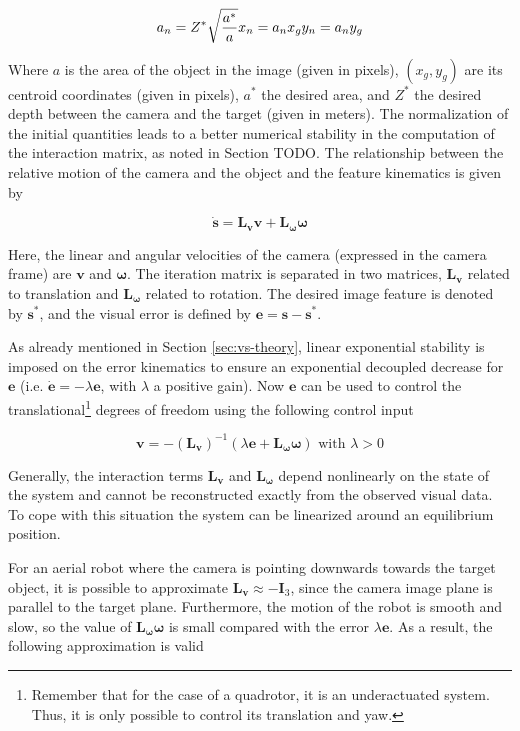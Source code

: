 \begin{equation*}
a_n = Z^\ast \sqrt{\frac{a^\ast}{a}} \\
x_n = a_n x_g \\
 y_n = a_n y_g 
\end{equation*}

Where $a$ is the area of the object in the image (given in pixels), $\left( x_g , y_g \right) $ are its centroid coordinates (given in pixels), $a^\ast$ the desired area, and $Z^\ast$ the desired depth between the camera and the target (given in meters). The normalization of the initial quantities leads to a better numerical stability in the computation of the interaction matrix, as noted in Section TODO. The relationship between the relative motion of the camera and the object and the feature kinematics is given by

\begin{equation}
\dot{\bm{s}} = \bm{L_v} \bm{v} + \bm{L_\omega} \bm{\omega}
\end{equation}

Here, the linear and angular velocities of the camera (expressed in the camera frame) are $\bm{v}$ and $\bm{\omega}$. The iteration matrix is separated in two matrices, $\bm{L_v}$ related to translation and $\bm{L_\omega}$ related to rotation. The desired image feature is denoted by $\bm{s}^\ast$, and the visual error is defined by $\bm{e} = \bm{s} - \bm{s}^\ast$.

As already mentioned in Section \ref{sec:vs-theory}, linear exponential stability is imposed on the error kinematics to ensure an exponential decoupled decrease for $\bm{e}$ (i.e. $\dot{\bm{e}} = - \lambda \bm{e}$, with $\lambda$ a positive gain). Now $\bm{e}$ can be used to control the translational\footnote{Remember that for the case of a quadrotor, it is an underactuated system. Thus, it is only possible to control its translation and yaw.} degrees of freedom using the following control input

\begin{equation}
\bm{v} = - (\bm{L_v})^{-1} (\lambda \bm{e} + \bm{L_\omega} \bm{\omega}) \text{ with } \lambda > 0
\end{equation}

Generally, the interaction terms $\bm{L_v}$ and $\bm{L_\omega}$ depend nonlinearly on the state of the system and cannot be reconstructed exactly from the observed visual data. To cope with this situation the system can be linearized around an equilibrium position.

For an aerial robot where the camera is pointing downwards towards the target object, it is possible to approximate $\bm{L_v} \approx - \bm{I}_3$, since the camera image plane is parallel to the target plane. Furthermore, the motion of the robot is smooth and slow, so the value of $\bm{L_\omega} \bm{\omega}$ is small compared with the error $\lambda \bm{e}$. As a result, the following approximation is valid


